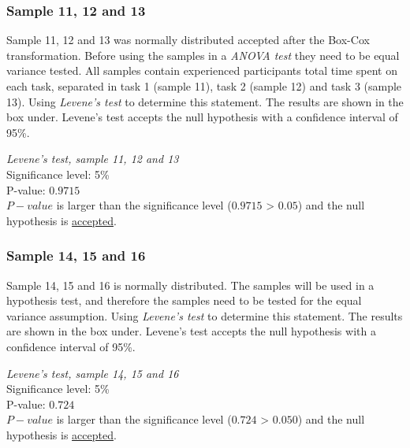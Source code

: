 \subsubsection{Sample 11, 12 and 13}\label{sec:sample11,12,13_levene}
Sample 11, 12 and 13 was normally distributed accepted after the Box-Cox transformation. Before using the samples in a \textit{ANOVA test} they need to be equal variance tested. All samples contain experienced participants total time spent on each task, separated in task 1 (sample 11), task 2 (sample 12) and task 3 (sample 13). Using \textit{Levene's test} to determine this statement. The results are shown in the box under. Levene's test accepts the null hypothesis with a confidence interval of 95\%. \\[0.2cm]

 \begin{center}
	\begin{tcolorbox}[width=0.8\textwidth]
		\centering
		\textit{Levene's test, sample 11, 12 and 13}\\
		Significance level: 5\%  \\[0.5cm]
		
		P-value: $0.9715$\\[0.2cm]
		
		$P-value$ is larger than the significance level ($0.9715$ > $0.05$) and the null hypothesis is \underline{accepted}.\\[0.5cm]
	\end{tcolorbox} 
\end{center}

\subsubsection{Sample 14, 15 and 16}\label{sec:sample14,15,16_levene}
Sample 14, 15 and 16 is normally distributed. The samples will be used in a hypothesis test, and therefore the samples need to be tested for the equal variance assumption. Using \textit{Levene's test} to determine this statement. The results are shown in the box under. Levene's test accepts the null hypothesis with a confidence interval of 95\%. \\[0.2cm]

 \begin{center}
	\begin{tcolorbox}[width=0.8\textwidth]
		\centering
		\textit{Levene's test, sample 14, 15 and 16}\\
		Significance level: 5\%  \\[0.5cm]
		
		P-value: $0.724$\\[0.2cm]
		
		$P-value$ is larger than the significance level ($0.724$ > $0.050$) and the null hypothesis is \underline{accepted}.\\[0.5cm]
	\end{tcolorbox} 
\end{center}

